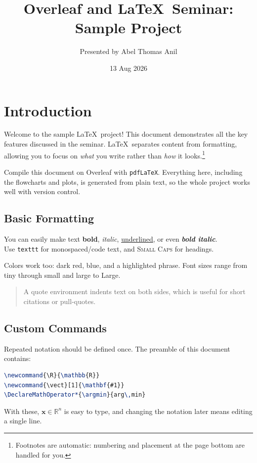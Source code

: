 \documentclass[12pt, a4paper]{article}
\title{Overleaf and \LaTeX\ Seminar: Sample Project}
\author{Presented by Abel Thomas Anil}
\date{13 Aug 2026}
\theoremstyle{plain}
\theoremstyle{definition}
\newcommand{\R}{\mathbb{R}}
\newcommand{\vect}[1]{\mathbf{#1}}
\DeclareMathOperator*{\argmin}{arg\,min}
\begin{document}

\maketitle
\thispagestyle{empty}
\tableofcontents
\listoffigures
\listoftables
\newpage

\section{Introduction}\label{sec:intro}
Welcome to the sample \LaTeX\ project! This document demonstrates all the key features discussed in the seminar. \LaTeX\ separates content from formatting, allowing you to focus on \emph{what} you write rather than \emph{how} it looks.\footnote{Footnotes are automatic: numbering and placement at the page bottom are handled for you.}

\begin{tipbox}
Compile this document on Overleaf with \texttt{pdfLaTeX}. Everything here, including the flowcharts and plots, is generated from plain text, so the whole project works well with version control.
\end{tipbox}

\subsection{Basic Formatting}
You can easily make text \textbf{bold}, \textit{italic}, \underline{underlined}, or even \textbf{\textit{bold italic}}. \\[0.3cm]
Use \texttt{texttt} for monospaced/code text, and \textsc{Small Caps} for headings.

Colors work too: \textcolor{red!70!black}{dark red}, \textcolor{blue!70!black}{blue}, and a \colorbox{yellow!40}{highlighted phrase}. Font sizes range from {\tiny tiny} through {\small small} and {\large large} to {\Large Large}.

\begin{quote}
A quote environment indents text on both sides, which is useful for short citations or pull-quotes.
\end{quote}

\subsection{Custom Commands}\label{sec:custom}
Repeated notation should be defined once. The preamble of this document contains:
\begin{lstlisting}[language=TeX, caption={Custom commands used in this document}]
\newcommand{\R}{\mathbb{R}}
\newcommand{\vect}[1]{\mathbf{#1}}
\DeclareMathOperator*{\argmin}{arg\,min}
\end{lstlisting}
With these, $\vect{x} \in \R^n$ is easy to type, and changing the notation later means editing a single line.
\end{document}
